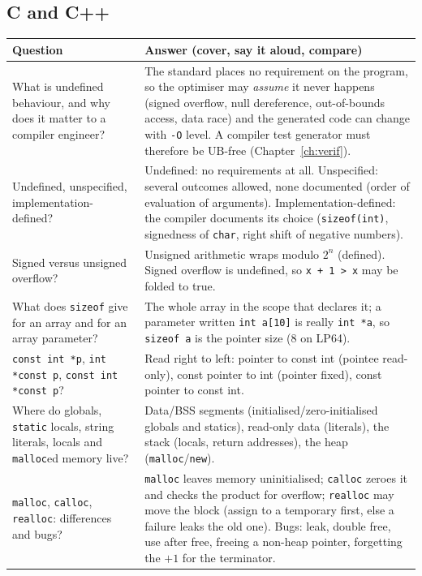 \documentclass[10pt,a4paper,openany,oneside]{report}
\begin{document}
\subsection{C and C++}
\begin{center}\small
\begin{xltabular}{\textwidth}{@{}L{4.6cm}Y@{}}
\toprule
\textbf{Question} & \textbf{Answer (cover, say it aloud, compare)}\\
\midrule\endhead
What is undefined behaviour, and why does it matter to a compiler engineer? & The standard places no requirement on the program, so the optimiser may \emph{assume} it never happens (signed overflow, null dereference, out-of-bounds access, data race) and the generated code can change with \texttt{-O} level. A compiler test generator must therefore be UB-free (Chapter~\ref{ch:verif}).\\
Undefined, unspecified, implementation-defined? & Undefined: no requirements at all. Unspecified: several outcomes allowed, none documented (order of evaluation of arguments). Implementation-defined: the compiler documents its choice (\texttt{sizeof(int)}, signedness of \texttt{char}, right shift of negative numbers).\\
Signed versus unsigned overflow? & Unsigned arithmetic wraps modulo $2^n$ (defined). Signed overflow is undefined, so \texttt{x + 1 > x} may be folded to true.\\
What does \texttt{sizeof} give for an array and for an array parameter? & The whole array in the scope that declares it; a parameter written \texttt{int a[10]} is really \texttt{int *a}, so \texttt{sizeof a} is the pointer size (8 on LP64).\\
\texttt{const int *p}, \texttt{int *const p}, \texttt{const int *const p}? & Read right to left: pointer to const int (pointee read-only), const pointer to int (pointer fixed), const pointer to const int.\\
Where do globals, \texttt{static} locals, string literals, locals and \texttt{malloc}ed memory live? & Data/BSS segments (initialised/zero-initialised globals and statics), read-only data (literals), the stack (locals, return addresses), the heap (\texttt{malloc}/\texttt{new}).\\
\texttt{malloc}, \texttt{calloc}, \texttt{realloc}: differences and bugs? & \texttt{malloc} leaves memory uninitialised; \texttt{calloc} zeroes it and checks the product for overflow; \texttt{realloc} may move the block (assign to a temporary first, else a failure leaks the old one). Bugs: leak, double free, use after free, freeing a non-heap pointer, forgetting the $+1$ for the terminator.\\

\end{xltabular}
\end{center}
\end{document}
